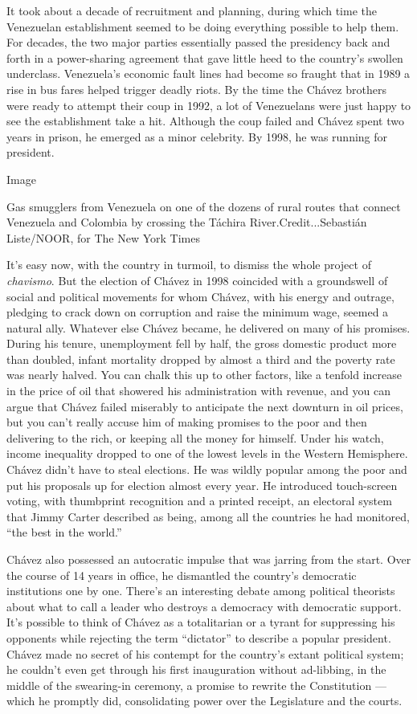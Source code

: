 It took about a decade of recruitment and planning, during which time
the Venezuelan establishment seemed to be doing everything possible to
help them. For decades, the two major parties essentially passed the
presidency back and forth in a power-sharing agreement that gave little
heed to the country's swollen underclass. Venezuela's economic fault
lines had become so fraught that in 1989 a rise in bus fares helped
trigger deadly riots. By the time the Chávez brothers were ready to
attempt their coup in 1992, a lot of Venezuelans were just happy to see
the establishment take a hit. Although the coup failed and Chávez spent
two years in prison, he emerged as a minor celebrity. By 1998, he was
running for president.

Image

Gas smugglers from Venezuela on one of the dozens of rural routes that
connect Venezuela and Colombia by crossing the Táchira
River.Credit...Sebastián Liste/NOOR, for The New York Times

It's easy now, with the country in turmoil, to dismiss the whole project
of \emph{chavismo}. But the election of Chávez in 1998 coincided with a
groundswell of social and political movements for whom Chávez, with his
energy and outrage, pledging to crack down on corruption and raise the
minimum wage, seemed a natural ally. Whatever else Chávez became, he
delivered on many of his promises. During his tenure, unemployment fell
by half, the gross domestic product more than doubled, infant mortality
dropped by almost a third and the poverty rate was nearly halved. You
can chalk this up to other factors, like a tenfold increase in the price
of oil that showered his administration with revenue, and you can argue
that Chávez failed miserably to anticipate the next downturn in oil
prices, but you can't really accuse him of making promises to the poor
and then delivering to the rich, or keeping all the money for himself.
Under his watch, income inequality dropped to one of the lowest levels
in the Western Hemisphere. Chávez didn't have to steal elections. He was
wildly popular among the poor and put his proposals up for election
almost every year. He introduced touch-screen voting, with thumbprint
recognition and a printed receipt, an electoral system that Jimmy Carter
described as being, among all the countries he had monitored, ``the best
in the world.''

Chávez also possessed an autocratic impulse that was jarring from the
start. Over the course of 14 years in office, he dismantled the
country's democratic institutions one by one. There's an interesting
debate among political theorists about what to call a leader who
destroys a democracy with democratic support. It's possible to think of
Chávez as a totalitarian or a tyrant for suppressing his opponents while
rejecting the term ``dictator'' to describe a popular president. Chávez
made no secret of his contempt for the country's extant political
system; he couldn't even get through his first inauguration without
ad-libbing, in the middle of the swearing-in ceremony, a promise to
rewrite the Constitution --- which he promptly did, consolidating power
over the Legislature and the courts.


